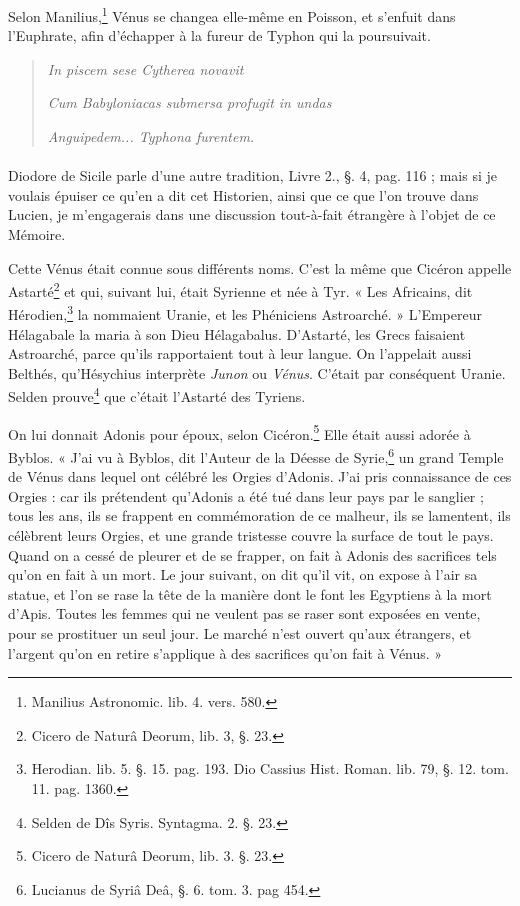 \documentclass[a4paper, 11pt, oneside, polutonikogreek, french]{article}
\begin{document}
Selon Manilius,\footnote{Manilius Astronomic. lib. 4. vers. 580.} Vénus se changea elle-même en Poisson, et s'enfuit dans l'Euphrate, afin d'échapper à la fureur de Typhon qui la poursuivait.
\begin{quotation}
\hspace*{15mm}\emph{In piscem sese Cytherea novavit}

\emph{Cum Babyloniacas submersa profugit in undas}

\emph{Anguipedem... Typhona furentem.}
\end{quotation}
\paragraph{}
Diodore de Sicile parle d'une autre tradition, Livre 2., §. 4, pag. 116 ; mais si je voulais épuiser ce qu'en a dit cet Historien, ainsi que ce que l'on trouve dans Lucien, je m'engagerais dans une discussion tout-à-fait étrangère à l'objet de ce Mémoire.

Cette Vénus était connue sous différents noms. C'est la même que Cicéron appelle Astarté\footnote{Cicero de Naturâ Deorum, lib. 3, §. 23.} et qui, suivant lui, était Syrienne et née à Tyr. « Les Africains, dit Hérodien,\footnote{Herodian. lib. 5. §. 15. pag. 193. Dio Cassius Hist. Roman. lib. 79, §. 12. tom. 11. pag. 1360.} la nommaient Uranie, et les Phéniciens Astroarché. » L'Empereur Hélagabale la maria à son Dieu Hélagabalus. D'Astarté, les Grecs faisaient Astroarché, parce qu'ils rapportaient tout à leur langue. On l'appelait aussi Belthés, qu'Hésychius interprète \emph{Junon} ou \emph{Vénus}. C'était par conséquent Uranie. Selden prouve\footnote{Selden de Dîs Syris. Syntagma. 2. §. 23.} que c'était l'Astarté des Tyriens.

On lui donnait Adonis pour époux, selon Cicéron.\footnote{Cicero de Naturâ Deorum, lib. 3. §. 23.} Elle était aussi adorée à Byblos. « J'ai vu à Byblos, dit l'Auteur de la Déesse de Syrie,\footnote{Lucianus de Syriâ Deâ, §. 6. tom. 3. pag 454.} un grand Temple de Vénus dans lequel ont célébré les Orgies d'Adonis. J'ai pris connaissance de ces Orgies : car ils prétendent qu'Adonis a été tué dans leur pays par le sanglier ; tous les ans, ils se frappent en commémoration de ce malheur, ils se lamentent, ils célèbrent leurs Orgies, et une grande tristesse couvre la surface de tout le pays. Quand on a cessé de pleurer et de se frapper, on fait à Adonis des sacrifices tels qu'on en fait à un mort. Le jour suivant, on dit qu'il vit, on expose à l'air sa statue, et l'on se rase la tête de la manière dont le font les Egyptiens à la mort d'Apis. Toutes les femmes qui ne veulent pas se raser sont exposées en vente, pour se prostituer un seul jour. Le marché n'est ouvert qu'aux étrangers, et l'argent qu'on en retire s'applique à des sacrifices qu'on fait à Vénus. »
\end{document}

